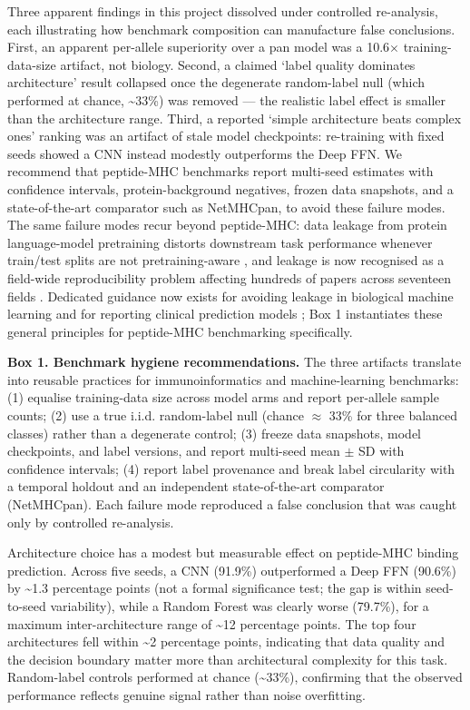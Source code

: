 \documentclass[10pt]{article}
\begin{document}
Three apparent findings in this project dissolved under controlled
re-analysis, each illustrating how benchmark composition can manufacture
false conclusions. First, an apparent per-allele superiority over a pan
model was a 10.6$\times$ training-data-size artifact, not biology. Second, a
claimed `label quality dominates architecture' result collapsed once the
degenerate random-label null (which performed at chance,
\textasciitilde33\%) was removed --- the realistic label effect is
smaller than the architecture range. Third, a reported `simple
architecture beats complex ones' ranking was an artifact of stale model
checkpoints: re-training with fixed seeds showed a CNN instead modestly
outperforms the Deep FFN. We recommend that peptide-MHC benchmarks
report multi-seed estimates with confidence intervals,
protein-background negatives, frozen data snapshots, and a
state-of-the-art comparator such as NetMHCpan, to avoid these failure
modes. The same failure modes recur beyond peptide-MHC: data leakage
from protein language-model pretraining distorts downstream task
performance whenever train/test splits are not pretraining-aware
\cite{Hermann24}, and leakage is now recognised as a field-wide
reproducibility problem affecting hundreds of papers across seventeen
fields \cite{Kapoor23}. Dedicated guidance now exists for
avoiding leakage in biological machine learning \cite{Bernett24}
and for reporting clinical prediction models \cite{Collins24}; Box
1 instantiates these general principles for peptide-MHC benchmarking
specifically.

\textbf{Box 1. Benchmark hygiene recommendations.} The three artifacts
translate into reusable practices for immunoinformatics and
machine-learning benchmarks: (1) equalise training-data size across
model arms and report per-allele sample counts; (2) use a true i.i.d.
random-label null (chance  $\approx$  33\% for three balanced classes) rather than
a degenerate control; (3) freeze data snapshots, model checkpoints, and
label versions, and report multi-seed mean $\pm$ SD with confidence
intervals; (4) report label provenance and break label circularity with
a temporal holdout and an independent state-of-the-art comparator
(NetMHCpan). Each failure mode reproduced a false conclusion that was
caught only by controlled re-analysis.

Architecture choice has a modest but measurable effect on peptide-MHC
binding prediction. Across five seeds, a CNN (91.9\%) outperformed a
Deep FFN (90.6\%) by \textasciitilde1.3 percentage points (not a formal
significance test; the gap is within seed-to-seed variability), while a
Random Forest was clearly worse (79.7\%), for a maximum
inter-architecture range of \textasciitilde12 percentage points. The top
four architectures fell within \textasciitilde2 percentage points,
indicating that data quality and the decision boundary matter more than
architectural complexity for this task. Random-label controls performed
at chance (\textasciitilde33\%), confirming that the observed
performance reflects genuine signal rather than noise overfitting.
\end{document}

